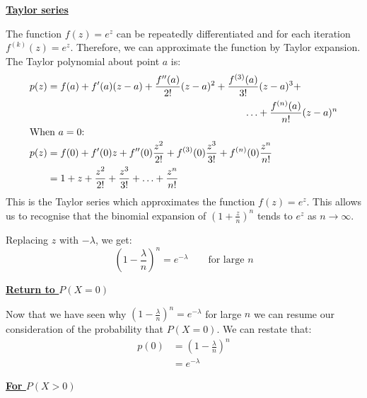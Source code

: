 \documentclass[a4paper, 12pt]{article}
\newcounter{QEq}				%
\numberwithin{equation}{QEq}	%
\begin{document}
\vspace{10mm}

\textbf{\underline{Taylor series}}

The function \(f(z) = e^z\) can be repeatedly differentiated and for each iteration \(f^{(k)}(z) = e^z\). Therefore, we can approximate the function by Taylor expansion. The Taylor polynomial about point  \(a\) is:
\begin{align}
	p(z) &= f(a) + f'(a)(z-a) + \frac{f''(a)}{2!}(z-a)^2 + \frac{f^{(3)}(a)}{3!}(z-a)^3 + \nonumber \\
	& \qquad \qquad \qquad \qquad \qquad \qquad \qquad \qquad \qquad \qquad \ldots + \frac{f^{(n)}(a)}{n!}(z-a)^n \nonumber \\
	\intertext{When  \(a=0\):}
	p(z) &= f(0) + f'(0)z + f''(0)\frac{z^2}{2!} + f^{(3)}(0)\frac{z^3}{3!} + f^{(n)}(0)\frac{z^n}{n!} \nonumber \\
	&= 1 + z  + \frac{z^2}{2!} + \frac{z^3}{3!} + \ldots + \frac{z^n}{n!} \label{eq:ptaylor}
\end{align}
This is the Taylor series which approximates the function \(f(z) = e^z\). This allows us to recognise that the binomial expansion of \(\left(1+\frac{z}{n}\right)^n\) tends to \(e^z\) as \(n \rightarrow \infty\).

Replacing \(z\) with \(-\lambda\), we get:
\begin{equation}
\left(1-\frac{\lambda}{n}\right)^n = e^{-\lambda} \qquad \text{for large } n \label{eq:e^lamba}
\end{equation}

\newpage{}

\textbf{\underline{Return to \(P(X=0)\)}}

Now that we have seen why \(\left(1-\frac{\lambda}{n}\right)^n = e^{-\lambda}\) for large \(n\) we can resume our consideration of the probability that \(P(X=0)\). We can restate that:
\begin{align}
	p(0) &= \left(1-\frac{\lambda}{n}\right)^n \nonumber \\[2mm]
	&= e^{-\lambda} \label{eq:p0}
\end{align}

\vspace{10mm}

\textbf{\underline{For \(P(X > 0)\)}}
\end{document}
